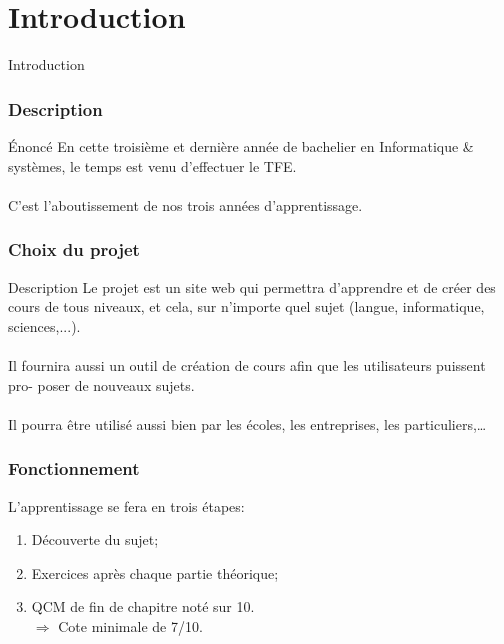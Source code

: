 \section{Introduction}
    
    \begin{frame}
        
        \begin{center}
            \huge{Introduction}
        \end{center}
        
    \end{frame}
    
    \begin{frame}
        \frametitle{Description}
        \begin{block}{Énoncé}
            En cette troisième et dernière année de bachelier en Informatique \& systèmes, le temps est venu d’effectuer le TFE. \\
            ~\\
            C'est l’aboutissement de nos trois années d’apprentissage.
        \end{block}
        
    \end{frame}
    
    \begin{frame}
        \frametitle{Choix du projet}
        \begin{block}{Description}
            Le projet est un site web qui permettra d’apprendre et de créer des cours de tous niveaux, et cela, sur n’importe quel sujet (langue, informatique, sciences,...). \\
            ~\\
            Il fournira aussi un outil de création de cours afin que les utilisateurs puissent pro- poser de nouveaux sujets. \\
            ~\\
            Il pourra être utilisé aussi bien par les écoles, les entreprises, les particuliers,…
        \end{block}
        
    \end{frame}
    
    \begin{frame}
    \frametitle{Fonctionnement}
        L’apprentissage se fera en trois étapes:\\
        \begin{enumerate}
            \item Découverte du sujet;
            
            \item Exercices après chaque partie théorique;
            
            \item QCM de fin de chapitre noté sur 10.\\
               $\Rightarrow$ Cote minimale de 7/10.
        \end{enumerate}
    \end{frame}
    
